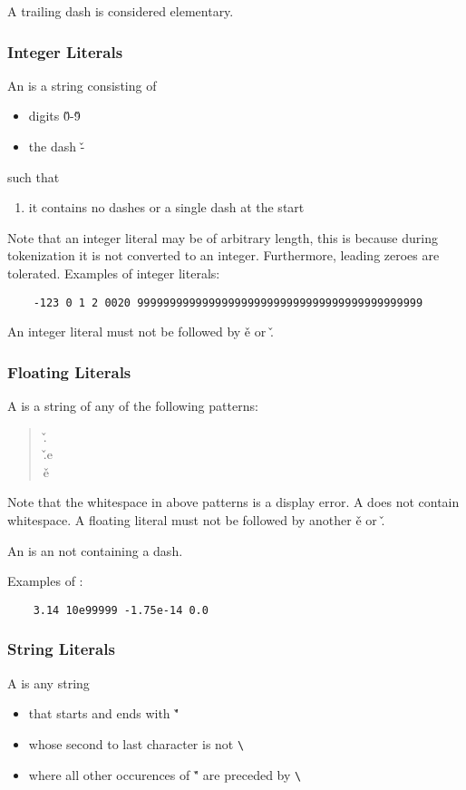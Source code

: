 \documentclass{article}
\begin{document}
A trailing dash is considered elementary.

\subsubsection{Integer Literals}
An \tint is a string consisting of
\begin{itemize}
    \item digits \v0-\v9
    \item the dash \v-
\end{itemize}
such that
\begin{enumerate}
    \item it contains no dashes or a single dash
    at the start
\end{enumerate}
Note that an integer literal may be of arbitrary length,
this is because during tokenization it is not 
converted to an integer.
Furthermore, leading zeroes are tolerated.
Examples of integer literals:
\begin{verbatim}
    -123 0 1 2 0020 99999999999999999999999999999999999999999999
\end{verbatim}
An integer literal must not be followed by \v e or \v.

\subsubsection{Floating Literals}
A \tfl is a string of any of the following patterns:
\begin{quote}
    \tint\v.\tuint\\
    \tint\v.\tuint e\tint\\
    \tint\v e\tint
\end{quote}
Note that the whitespace in above patterns is 
a display error. A \tfl does not contain whitespace.
A floating literal must not be followed by another \v e or \v.

An \tuint is an \tint not containing a dash.

Examples of \tfl:
\begin{verbatim}
    3.14 10e99999 -1.75e-14 0.0
\end{verbatim}

\subsubsection{String Literals}
A \tstr is any string
\begin{itemize}
    \item that starts and ends with \v"
    \item whose second to last character is not \verb$\$
    \item where all other occurences of \v" are preceded by \verb$\$
\end{itemize}
\end{document}
